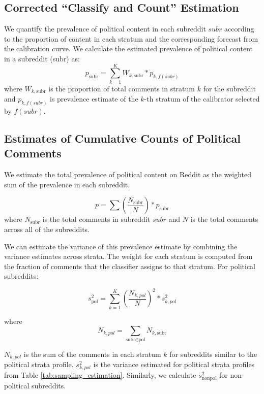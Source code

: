 \documentclass[letterpaper]{article} %
\begin{document}
\subsection{Corrected ``Classify and Count'' Estimation}\label{estimate}

We quantify the prevalence of political content in each subreddit $subr$ according to the proportion of content in each stratum and the corresponding forecast from the calibration curve. We calculate the estimated prevalence of political content in a subreddit (subr) as:
\begin{displaymath}
p_{\textrm{subr}}= \sum_{k=1}^{K}W_{k,\textrm{subr}} * p_{k,f(subr)}
\end{displaymath}
where $W_{k,\textrm{subr}}$ is the proportion of total comments in stratum $k$ for the subreddit and $p_{k,f(subr)}$ is prevalence estimate of the $k$-th stratum of the calibrator selected by $f(subr)$. 

\subsection{Estimates of Cumulative Counts of Political Comments}\label{cumulative}

We estimate the total prevalence of political content on Reddit as the weighted sum of the prevalence in each subreddit.

\begin{displaymath}
p = \sum \left(\frac{N_{\textrm{subr}}}{N}\right) * p_{\textrm{subr}}
\end{displaymath}
where $N_{\textrm{subr}}$ is the total comments in subreddit $subr$ and $N$ is the total comments across all of the subreddits.

We can estimate the variance of this prevalence estimate by combining the variance estimates across strata. The weight for each stratum is computed from the fraction of comments that the classifier assigns to that stratum. For political subreddits:



\begin{displaymath}
s^2_{\textrm{pol}} =  \sum_{k=1}^{K}{\left(\frac{N_{k,pol}}{N}\right)^2 * s^2_{k,pol}}
\end{displaymath}

where
\begin{displaymath}
N_{k,pol} = \sum_{\textrm{subr} \in \textrm{pol}}N_{k, \textrm{subr}}
\end{displaymath}

$N_{k,pol}$ is the sum of the comments in each stratum $k$ for subreddits similar to the political strata profile. $s^2_{k,pol}$ is the variance estimated for political strata profiles from Table \ref{tab:sampling_estimation}. Similarly, we calculate $s^2_{\textrm{nonpol}}$ for non-political subreddits.
\end{document}

